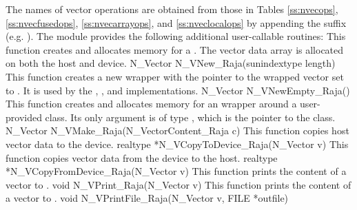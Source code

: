 The names of vector operations are obtained from those in Tables \ref{ss:nvecops},
\ref{ss:nvecfusedops}, \ref{ss:nvecarrayops}, and \ref{ss:nveclocalops}
by appending the suffix  (e.g. ).
The module {\nvecraja}  provides the following additional user-callable routines:
{
  This function creates and allocates memory for a {\cuda} .
  The vector data array is allocated on both the host and device.
}
{
  N\_Vector N\_VNew\_Raja(sunindextype length)
}
{
  This function creates a new {\nvector} wrapper with the pointer to
  the wrapped {\raja} vector set to . It is used by the
  , , and 
  implementations.
}
{
  N\_Vector N\_VNewEmpty\_Raja()
}
{
  This function creates and allocates memory for an {\nvecraja}
  wrapper around a user-provided  class.
  Its only argument is of type \newline
  , which is the pointer to the class.
}
{
  N\_Vector N\_VMake\_Raja(N\_VectorContent\_Raja c)
}
{
 This function copies host vector data to the device.
}
{
 realtype *N\_VCopyToDevice\_Raja(N\_Vector v)
}
{
  This function copies vector data from the device to the host.
}
{
  realtype *N\_VCopyFromDevice\_Raja(N\_Vector v)
}
{
  This function prints the content of a {\raja} vector to .
}
{
  void N\_VPrint\_Raja(N\_Vector v)
}
{
  This function prints the content of a {\raja} vector to .
}
{
  void N\_VPrintFile\_Raja(N\_Vector v, FILE *outfile)
}

